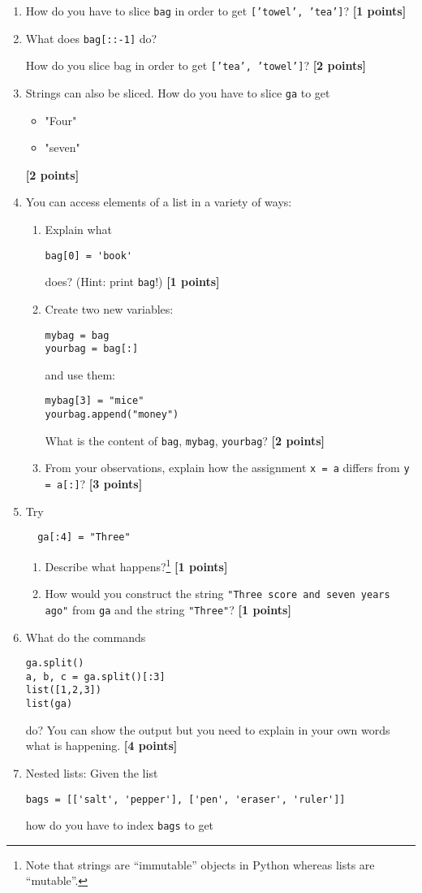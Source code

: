 \documentclass[letterpaper]{scrartcl}
\newcommand{\points}[1]{\textbf{[#1 points]}}
\newenvironment{enuma}{\begin{enumerate}[label=(\alph*)]}{\end{enumerate}}
\newenvironment{enumi}{\begin{enumerate}[label=(\roman*)]}{\end{enumerate}}
\newcommand{\python}[1]{\texttt{#1}}
\begin{document}
\begin{enuma}
\item How do you have to slice \python{bag} in order to get
  \python{['towel', 'tea']}? \points{1}
\item What does \python{bag[::-1]} do?  
  
  How do you slice bag in order to get
  \python{['tea', 'towel']}?  \points{2}
\item Strings can also be sliced. How do you have to slice \python{ga}
  to get
  \begin{itemize}
  \item   "Four"
  \item   "seven"
  \end{itemize}
  \points{2}
\item You can access elements of a list in a variety of ways: 
  \begin{enumi}
  \item   Explain what
\begin{verbatim}
bag[0] = 'book'
\end{verbatim}
    does? (Hint: print \python{bag}!) \points{1}
  \item  Create two new variables:
\begin{verbatim}
mybag = bag
yourbag = bag[:]
\end{verbatim}
    and use them:
\begin{verbatim}
mybag[3] = "mice" 
yourbag.append("money")
\end{verbatim}
    What is the content of \python{bag}, \python{mybag},
    \python{yourbag}? \points{2}
  \item  From your observations, explain how the assignment \python{x = a} differs
    from \python{y = a[:]}? \points{3}
  \end{enumi}
\item  Try
\begin{verbatim}
  ga[:4] = "Three"
\end{verbatim}
  \begin{enumi}
  \item Describe what happens?\footnote{Note that strings are
      ``immutable'' objects in Python whereas lists are ``mutable''.}
    \points{1}
  \item How would you construct the string \python{"Three score and
      seven years ago"} from \python{ga} and the string
    \python{"Three"}? \points{1}
  \end{enumi}
\item What do the commands
\begin{verbatim}
ga.split()
a, b, c = ga.split()[:3]
list([1,2,3])
list(ga)
\end{verbatim}
  do? You can show the output but you need to explain in your own
  words what is happening. \points{4}
\item Nested lists: Given the list
\begin{verbatim}
bags = [['salt', 'pepper'], ['pen', 'eraser', 'ruler']]
\end{verbatim}
  how do you have to index \python{bags} to get


\end{enuma}
\end{document}
